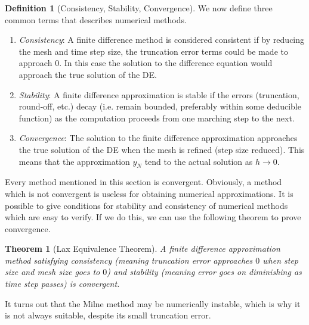 \documentclass{article}
\newtheorem{theorem}{Theorem}[section]
\theoremstyle{remark}
\theoremstyle{definition}
\newtheorem{definition}{Definition}[section]
\begin{document}
\begin{definition}[Consistency, Stability, Convergence]
We now define three common terms that describes numerical methods. 
\begin{enumerate}
    \item \textit{Consistency}: A finite difference method is considered consistent if by reducing the mesh and time step size, the truncation error terms could be made to approach $0$. In this case the solution to the difference equation would approach the true solution of the DE. 
    \item \textit{Stability}: A finite difference approximation is stable if the errors (truncation, round-off, etc.) decay (i.e. remain bounded, preferably within some deducible function) as the computation proceeds from one marching step to the next. 
    \item \textit{Convergence}: The solution to the finite difference approximation approaches the true solution of the DE when the mesh is refined (step size reduced). This means that the approximation $y_N$ tend to the actual solution as $h \rightarrow 0$. 
\end{enumerate}
\end{definition}

Every method mentioned in this section is convergent. Obviously, a method which is not convergent is useless for obtaining numerical approximations. It is possible to give conditions for stability and consistency of numerical methods which are easy to verify. If we do this, we can use the following theorem to prove convergence. 

\begin{theorem}[Lax Equivalence Theorem]
A finite difference approximation method satisfying consistency (meaning truncation error approaches $0$ when step size and mesh size goes to $0$) and stability (meaning error goes on diminishing as time step passes) is convergent. 
\end{theorem}

It turns out that the Milne method may be numerically instable, which is why it is not always suitable, despite its small truncation error. 
\end{document}
